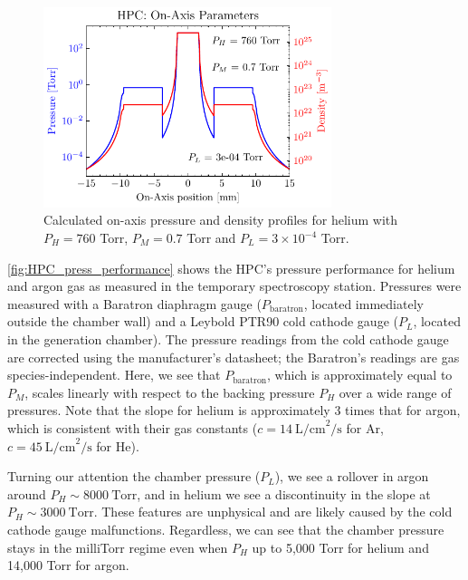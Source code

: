 \begin{figure}
	\centering
	\includegraphics[width=0.75\textwidth]{figures/chap3/HPC_on-axis-pressure.pdf}
	\caption{Calculated on-axis pressure and density profiles for helium with $P_H = 760$ Torr, $P_M = 0.7$ Torr and $P_L = 3 \times 10^{-4}$ Torr.}
	\label{fig:HPC_on-axis-pressure}
\end{figure}

\cref{fig:HPC_press_performance} shows the HPC's pressure performance for helium and argon gas as measured in the temporary spectroscopy station. Pressures were measured with a Baratron diaphragm gauge ($P_{\textrm{baratron}}$, located immediately outside the chamber wall) and a Leybold PTR90 cold cathode gauge ($P_L$, located in the generation chamber). The pressure readings from the cold cathode gauge are corrected using the manufacturer's datasheet; the Baratron's readings are gas species-independent. Here, we see that $P_{\textrm{baratron}}$, which is approximately equal to $P_M$, scales linearly with respect to the backing pressure $P_H$ over a wide range of pressures. Note that the slope for helium is approximately 3 times that for argon, which is consistent with their gas constants ($c=14 \ \textrm{L/cm}^2\textrm{/s}$ for Ar, $c=45 \ \textrm{L/cm}^2\textrm{/s}$ for He).

Turning our attention the chamber pressure ($P_L$), we see a rollover in argon around $P_H \sim 8000 \ \textrm{Torr}$, and in helium we see a discontinuity in the slope at $P_H \sim 3000 \ \textrm{Torr}$. These features are unphysical and are likely caused by the cold cathode gauge malfunctions. Regardless, we can see that the chamber pressure stays in the milliTorr regime even when $P_H$ up to 5,000 Torr for helium and 14,000 Torr for argon.


